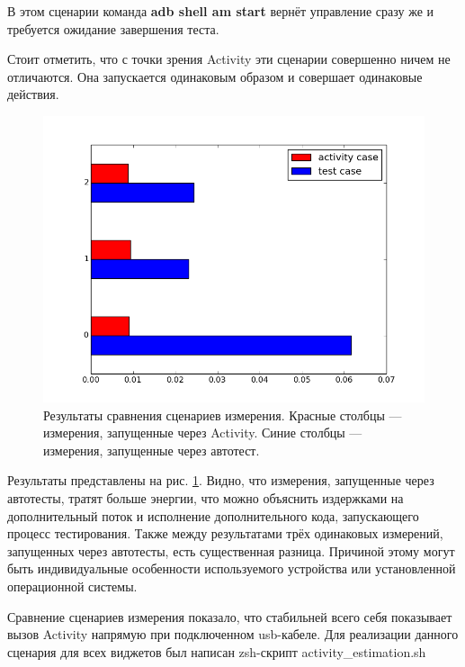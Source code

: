 \documentclass[a4paper,14pt]{extarticle} %
\begin{document}
	В этом сценарии команда \textbf{adb shell am start} вернёт управление сразу же и требуется ожидание завершения теста.
	
	Стоит отметить, что с точки зрения Activity эти сценарии совершенно ничем не отличаются. Она запускается одинаковым образом и совершает одинаковые действия.
	
	\begin{figure}[tbh]
		\includegraphics[width=\textwidth]{test_comparation}
		\caption{Результаты сравнения  сценариев измерения. Красные столбцы --- измерения, запущенные через Activity. Синие столбцы --- измерения, запущенные через автотест.}
		\label{fig:test_comparation}
	\end{figure}

	Результаты представлены на рис. \ref{fig:test_comparation}. Видно, что измерения, запущенные через автотесты, тратят больше энергии, что можно объяснить издержками на дополнительный поток и исполнение дополнительного кода, запускающего процесс тестирования. Также между результатами трёх одинаковых измерений, запущенных через автотесты, есть существенная разница. Причиной этому могут быть индивидуальные особенности используемого устройства или установленной операционной системы.
	
	Сравнение сценариев измерения показало, что стабильней всего себя показывает вызов Activity напрямую при подключенном usb-кабеле. Для реализации данного сценария для всех виджетов был написан zsh-скрипт activity\_estimation.sh~\ris{\ref{fig:activity_estimation}}
	
\end{document}

